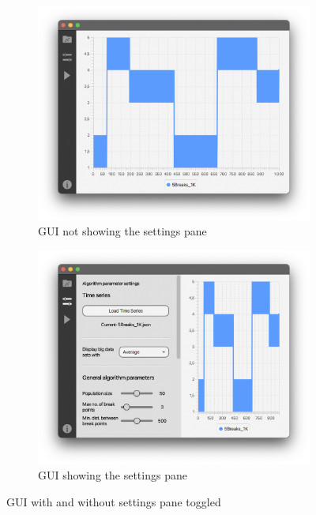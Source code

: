 \begin{figure}[ht]
    \centering
    \begin{subfigure}[b]{.48\textwidth}
        \centering
        \includegraphics[width=\textwidth]{fig/gui-toggle-off.png}
        \caption{GUI not showing the settings pane}
        \label{fig:gui-toggle-off}
    \end{subfigure}
    \hfill
    \begin{subfigure}[b]{.48\textwidth}
        \centering
        \includegraphics[width=\textwidth]{fig/gui-toggle-on.png}
        \caption{GUI showing the settings pane}
        \label{fig:gui-toggle-on}
    \end{subfigure}
    \caption{GUI with and without settings pane toggled}
    \label{fig:gui-toggle-ex}
\end{figure}

